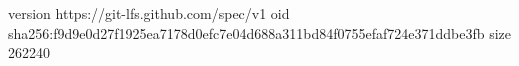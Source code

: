 version https://git-lfs.github.com/spec/v1
oid sha256:f9d9e0d27f1925ea7178d0efc7e04d688a311bd84f0755efaf724e371ddbe3fb
size 262240
